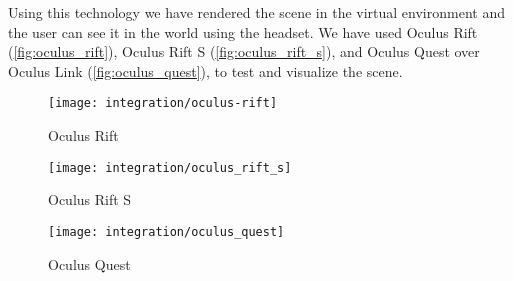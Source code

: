 Using this technology we have rendered the scene in the virtual environment and the user can see it in the  world using the  headset. We have used Oculus Rift (\autoref{fig:oculus_rift}), Oculus Rift S (\autoref{fig:oculus_rift_s}), and Oculus Quest over Oculus Link (\autoref{fig:oculus_quest}), to test and visualize the scene.

\begin{figure}
  \centering
  \texttt{[image: integration/oculus-rift]}
  \caption{Oculus Rift}\label{fig:oculus_rift}
\end{figure}

\begin{figure}
  \centering
  \texttt{[image: integration/oculus\_rift\_s]}
  \caption{Oculus Rift S}\label{fig:oculus_rift_s}
\end{figure}

\begin{figure}
  \centering
  \texttt{[image: integration/oculus\_quest]}
  \caption{Oculus Quest}\label{fig:oculus_quest}
\end{figure}

